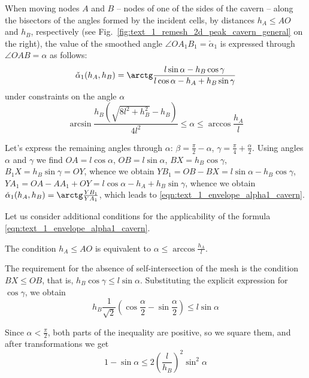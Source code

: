 \documentclass[
11pt,%
tightenlines,%
twoside,%
onecolumn,%
nofloats,%
nobibnotes,%
nofootinbib,%
superscriptaddress,%
noshowpacs,%
centertags]%
{revtex4}
\begin{document}
\begin{lemma}\label{lem:text_1_cavern_smooth}
When moving nodes $A$ and $B$ -- nodes of one of the sides of the cavern -- along the bisectors of the angles formed by the incident cells, by distances $h_A \le AO$ and $h_B$, respectively (see Fig.~\ref{fig:text_1_remesh_2d_peak_cavern_general} on the right), the value of the smoothed angle $\angle OA_1B_1 = \check{\alpha}_1$ is expressed through $\angle OAB = \alpha$ as follows:
\begin{equation}\label{eqn:text_1_envelope_alpha1_cavern}
\check{\alpha}_1(h_A, h_B) = \arctg \frac{l \sin \alpha - h_B \cos \gamma}{l \cos \alpha - h_A + h_B \sin \gamma}
\end{equation}
under constraints on the angle $\alpha$
\begin{equation}\label{eqn:text_1_envelope_alpha1_cavern2}
\arcsin \frac{h_B \left( \sqrt{8 l^2 + h_B^2} - h_B \right)}{4 l^2} \le \alpha \le \arccos \frac{h_A}{l}
\end{equation}
\end{lemma}

Let's express the remaining angles through $\alpha$: $\beta = \frac{\pi}{2} - \alpha$, $\gamma = \frac{\pi}{4} + \frac{\alpha}{2}$. Using angles $\alpha$ and $\gamma$ we find $OA = l \cos \alpha$, $OB = l \sin \alpha$, $BX = h_B \cos \gamma$, $B_1X = h_B \sin \gamma = OY$, whence we obtain $YB_1 = OB - BX = l \sin \alpha - h_B \cos \gamma$, $YA_1 = OA - AA_1 + OY = l \cos \alpha - h_A + h_B \sin \gamma$, whence we obtain $\check{\alpha}_1(h_A, h_B) = \arctg \frac{YB_1}{YA_1}$, which leads to \eqref{eqn:text_1_envelope_alpha1_cavern}.

Let us consider additional conditions for the applicability of the formula \eqref{eqn:text_1_envelope_alpha1_cavern}.

The condition $h_A \le AO$ is equivalent to $\alpha \le \arccos \frac{h_A}{l}$.

The requirement for the absence of self-intersection of the mesh is the condition $BX \le OB$, that is, $h_B \cos \gamma \le l \sin \alpha$.
Substituting the explicit expression for $\cos \gamma$, we obtain
\begin{equation}
	h_B \frac{1}{\sqrt{2}} \left( \cos \frac{\alpha}{2} - \sin \frac{\alpha}{2} \right) \le l \sin \alpha
\end{equation}

Since $\alpha < \frac{\pi}{2}$, both parts of the inequality are positive, so we square them, and after transformations we get
\begin{equation}\label{eqn:text_1_envelope_find_alpha3}
	1 - \sin \alpha \le 2 \left( \frac{l}{h_B} \right)^2 \sin^2 \alpha
\end{equation}
\end{document}
